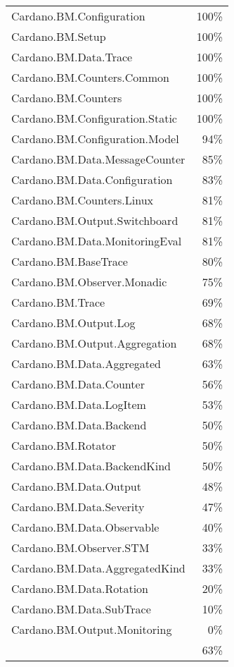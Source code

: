 \begin{tabular}{l r}
   Cardano.BM.Configuration & 100\% \\
   Cardano.BM.Setup & 100\% \\
   Cardano.BM.Data.Trace & 100\% \\
   Cardano.BM.Counters.Common & 100\% \\
   Cardano.BM.Counters & 100\% \\
   Cardano.BM.Configuration.Static & 100\% \\
   Cardano.BM.Configuration.Model & 94\% \\
   Cardano.BM.Data.MessageCounter & 85\% \\
   Cardano.BM.Data.Configuration & 83\% \\
   Cardano.BM.Counters.Linux & 81\% \\
   Cardano.BM.Output.Switchboard & 81\% \\
   Cardano.BM.Data.MonitoringEval & 81\% \\
   Cardano.BM.BaseTrace & 80\% \\
   Cardano.BM.Observer.Monadic & 75\% \\
   Cardano.BM.Trace & 69\% \\
   Cardano.BM.Output.Log & 68\% \\
   Cardano.BM.Output.Aggregation & 68\% \\
   Cardano.BM.Data.Aggregated & 63\% \\
   Cardano.BM.Data.Counter & 56\% \\
   Cardano.BM.Data.LogItem & 53\% \\
   Cardano.BM.Data.Backend & 50\% \\
   Cardano.BM.Rotator & 50\% \\
   Cardano.BM.Data.BackendKind & 50\% \\
   Cardano.BM.Data.Output & 48\% \\
   Cardano.BM.Data.Severity & 47\% \\
   Cardano.BM.Data.Observable & 40\% \\
   Cardano.BM.Observer.STM & 33\% \\
   Cardano.BM.Data.AggregatedKind & 33\% \\
   Cardano.BM.Data.Rotation & 20\% \\
   Cardano.BM.Data.SubTrace & 10\% \\
   Cardano.BM.Output.Monitoring & 0\% \\
    & 63\% \\
\end{tabular}
